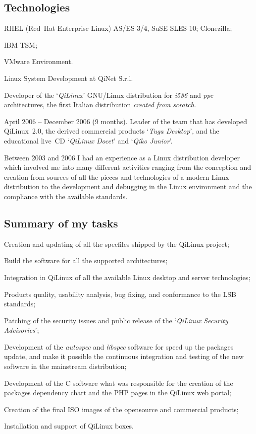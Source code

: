 \subsection{Technologies}

\item{\bdot} RHEL (Red~Hat Enterprise Linux) AS/ES 3/4, SuSE SLES 10; Clonezilla;
\item{\bdot} IBM TSM;
\item{\bdot} VMware Environment.
 

   {Linux System Development at QiNet S.r.l.}

Developer of the `{\it QiLinux\/}' GNU/Linux distribution for {\it i586} and
{\it ppc} architectures, the first Italian distribution
{\it created from scratch}.

April 2006 -- December 2006 (9 months). 
Leader of the team that has developed QiLinux~2.0, the derived commercial 
products `{\it Tuga Desktop\/}', and the educational live~CD 
`{\it QiLinux Docet\/}' and `{\it Qiko Junior\/}'.

Between 2003 and 2006 I had an experience as a Linux distribution developer 
which involved me into many different activities ranging from the conception
and creation from sources of all the pieces and technologies of a modern Linux
distribution to the development and debugging in the Linux environment and 
the compliance with the available standards.

\subsection{Summary of my tasks}

\item{\bdot} Creation and updating of all the specfiles shipped by the QiLinux project;
\item{\bdot} Build the software for all the supported architectures;
\item{\bdot} Integration in QiLinux of all the available Linux desktop and server technologies;
\item{\bdot} Products quality, usability analysis, bug fixing, and conformance to
    the LSB standards;
\item{\bdot} Patching of the security issues and public release of the 
   `{\it QiLinux Security Advisories\/}';
\item{\bdot} Development of the {\it autospec} and {\it libspec} software for speed up the
    packages update, and make it possible the continuous
    integration and testing of the new software in the mainstream distribution;
\item{\bdot} Development of the C software what was responsible for the creation
   of the packages dependency chart and the PHP pages in the QiLinux web portal;
\item{\bdot} Creation of the final ISO images of the opensource and commercial products;
\item{\bdot} Installation and support of QiLinux boxes.

